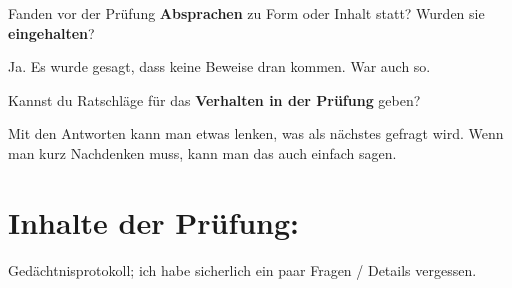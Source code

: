 \documentclass[a4paper]{article}
\begin{document}
\begin{multicols}{2}
\begin{minipage}[t][6.8cm]{\linewidth}
  \end{minipage}

   Fanden vor der Prüfung \textbf{Absprachen} zu Form oder Inhalt statt? Wurden sie \textbf{eingehalten}? \\
  \begin{minipage}[t][7cm]{\linewidth}
    Ja. Es wurde gesagt, dass keine Beweise dran kommen. War auch so.

  \end{minipage}

   Kannst du Ratschläge für das \textbf{Verhalten in der Prüfung} geben? \\
  \begin{minipage}[t][6.8cm]{\linewidth}
    Mit den Antworten kann man etwas lenken, was als nächstes gefragt wird.
    Wenn man kurz Nachdenken muss, kann man das auch einfach sagen.

  \end{minipage}
%
\end{multicols}
\clearpage

\section*{Inhalte der Prüfung:}
Gedächtnisprotokoll; ich habe sicherlich ein paar Fragen / Details vergessen.
\end{document}
